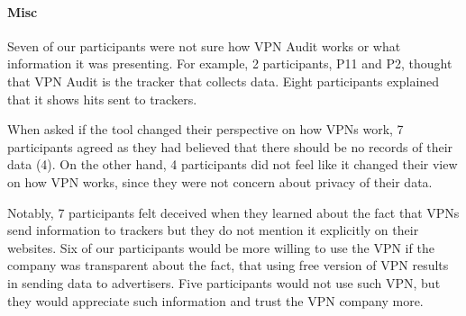 \paragraph{Misc} 

Seven of our participants were not sure how VPN Audit works or what
information it was presenting. For example, 2 participants, P11 and P2,
thought that VPN Audit is the tracker that collects data. Eight participants
explained that it shows hits sent to trackers. 

When asked if the tool changed their perspective on how VPNs work, 7
participants agreed as they had believed that there should be no records of
their data (4). On the other hand, 4 participants did not feel like it changed
their view on how VPN works, since they were not concern about privacy of
their data.

Notably, 7 participants felt deceived when they learned about the fact that
VPNs send information to trackers but they do not mention it explicitly on
their websites. Six of our participants would be more willing to use the VPN
if the company was transparent about the fact, that using free version of VPN
results in sending data to advertisers. Five participants would not use such
VPN, but they would appreciate such information and trust the VPN company
more.